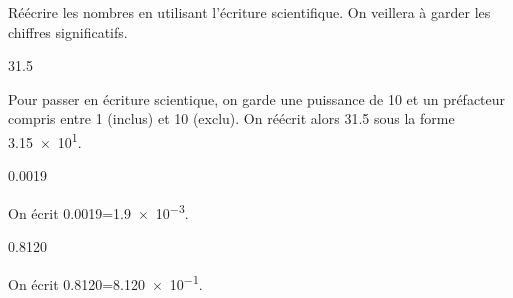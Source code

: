 Réécrire les nombres en utilisant l'écriture scientifique. On veillera à garder les chiffres significatifs.

\debutEntrainement


\begin{enonce}
\num{31.5}
\end{enonce}


\begin{corrige}
Pour passer en écriture scientique, on garde une puissance de 10 et un préfacteur compris entre 1 (inclus) et 10 (exclu). On réécrit alors \num{31.5} sous la forme \num{3.15e1}.
\end{corrige}




\begin{enonce}
\num{0,0019}
\end{enonce}


\begin{corrigeNewpage}
On écrit \num{0,0019}=\num{1,9e-3}.
\end{corrigeNewpage}




\begin{enonce}
\num{0,8120}
\end{enonce}


\begin{corrige}
On écrit \num{0,8120}=\num{8,120e-1}.
\end{corrige}




